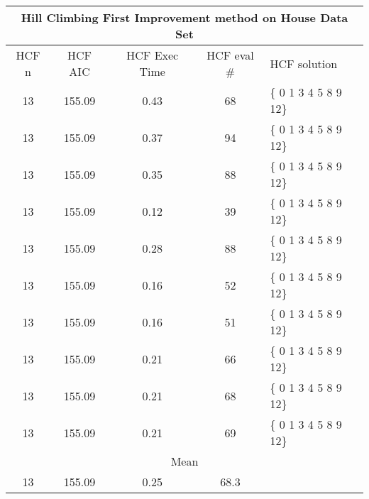 \begin{tabular}{|c|c|c|c|l|}
	\hline
	\multicolumn{5}{|c|}{Hill Climbing First Improvement method on House Data Set}            \\ \hline
	HCF n & HCF AIC     & HCF Exec Time & HCF eval \# & HCF solution          \\ \hline
	13    & 155.09 & 0.43              & 68                     & \{ 0 1 3 4 5 8 9 12\} \\ \hline
	13    & 155.09 & 0.37              & 94                     & \{ 0 1 3 4 5 8 9 12\} \\ \hline
	13    & 155.09 & 0.35              & 88                     & \{ 0 1 3 4 5 8 9 12\} \\ \hline
	13    & 155.09 & 0.12               & 39                     & \{ 0 1 3 4 5 8 9 12\} \\ \hline
	13    & 155.09 & 0.28              & 88                     & \{ 0 1 3 4 5 8 9 12\} \\ \hline
	13    & 155.09 & 0.16              & 52                     & \{ 0 1 3 4 5 8 9 12\} \\ \hline
	13    & 155.09 & 0.16              & 51                     & \{ 0 1 3 4 5 8 9 12\} \\ \hline
	13    & 155.09 & 0.21              & 66                     & \{ 0 1 3 4 5 8 9 12\} \\ \hline
	13    & 155.09 & 0.21              & 68                     & \{ 0 1 3 4 5 8 9 12\} \\ \hline
	13    & 155.09 & 0.21              & 69                     & \{ 0 1 3 4 5 8 9 12\} \\ \hline
	\multicolumn{5}{|c|}{Mean}                                                                \\ \hline
	13    & 155.09 & 0.25             & 68.3                   &                       \\ \hline
\end{tabular}


